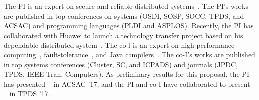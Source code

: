 The PI is an expert on secure and reliable distributed 
systems~\cite{smt:cacm, cui:tern:osdi10, peregrine:sosp11,
parrot:sosp13, crane:sosp15, tripod:apsys16, kakute:acsac17, apus:socc17,
confluence:tpds17}. The PI's works are published in top conferences on systems 
(OSDI, SOSP, SOCC, TPDS, and ACSAC) and programming languages (PLDI and ASPLOS). 
Recently, the PI has collaborated with Huawei to launch a technology transfer 
project based on his dependable distributed system~\cite{apus:socc17}.
The co-I is an expert on high-performance 
computing~\cite{powerrock,hwang,jessica,cheung,khokhar}, fault-tolerance~\cite{ 
sheng,shengdi1}, and Java compilers~\cite{rhymes,shengdi,jessica2}. The 
co-I's works are published in top systems conferences (Cluster, SC, 
and ICPADS) and journals (JPDC, TPDS, IEEE Tran. Computers). As 
preliminary results for this proposal, the PI has 
presented \kakute~\cite{kakute:acsac17} in ACSAC '17, and the PI and co-I have 
collaborated to present \confluence~\cite{confluence:tpds17} in TPDS '17.



